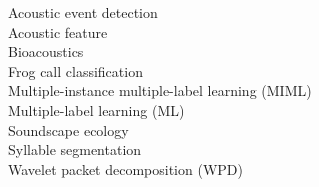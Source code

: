 %



\begin{keywords}
Acoustic event detection\\
Acoustic feature \\
Bioacoustics \\
Frog call classification \\
Multiple-instance multiple-label learning (MIML) \\
Multiple-label learning (ML)\\
Soundscape ecology\\
Syllable segmentation\\
Wavelet packet decomposition (WPD)\\

 
\end{keywords}







